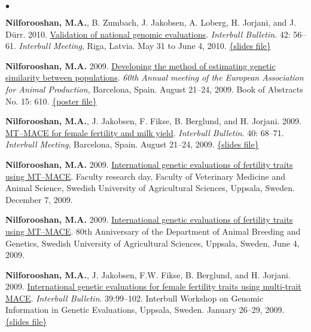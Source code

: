 \documentclass[margin,line]{res}
\newenvironment{list2}{
  \begin{list}{$\bullet$}{%
      \setlength{\itemsep}{0in}
      \setlength{\parsep}{0in} \setlength{\parskip}{0in}
      \setlength{\topsep}{0in} \setlength{\partopsep}{0in}
      \setlength{\leftmargin}{0.2in}}}{\end{list}}
\begin{document}
\begin{resume}
\begin{list2}
\item {\bf Nilforooshan, M.A.}, B. Zumbach, J. Jakobsen, A. Loberg, H. Jorjani, and J. D\"{u}rr. 2010. \href{https://www.researchgate.net/publication/358199921_Validation_of_National_Genomic_Evaluations}{Validation of national genomic evaluations}. {\em Interbull Bulletin}. 42: 56--61. {\em Interbull Meeting}, Riga, Latvia. May 31 to June 4, 2010. \href{https://drive.google.com/file/d/0B2l_izQwJmVpRnlPa0YzS3ZCU1E/view?usp=sharing&resourcekey=0-Tsw-3ZQhJPn8Cm8kG1E6xw}{\{slides file\}}
\item {\bf Nilforooshan, M.A.} 2009. \href{https://www.researchgate.net/publication/358219264_Developing_the_method_of_estimating_genetic_similarity_between_populations}{Developing the method of estimating genetic similarity between populations}. {\em 60th Annual meeting of the European Association for Animal Production}, Barcelona, Spain. August 21--24, 2009. Book of Abstracts No. 15: 610. \href{https://doi.org/10.13140/RG.2.2.11140.40320}{\{poster file\}}
\item {\bf Nilforooshan, M.A.}, J. Jakobsen, F. Fikse, B. Berglund, and H. Jorjani. 2009. \href{https://www.researchgate.net/publication/239611615_MT-MACE_for_Female_Fertility_and_Milk_Yield}{MT–MACE for female fertility and milk yield}. {\em Interbull Bulletin}. 40: 68--71. {\em Interbull Meeting}, Barcelona, Spain. August 21--24, 2009. \href{https://drive.google.com/file/d/0B2l_izQwJmVpRTlrOGE3OWluVnc/view?usp=sharing&resourcekey=0-LiA6IgIqSEjLxrAFkXL_Bw}{\{slides file\}}
\item {\bf Nilforooshan, M.A.} 2009. \href{https://drive.google.com/file/d/0B2l_izQwJmVpUC1TVkx2MVc1ZUE/view?usp=sharing&resourcekey=0-l8dXNYtXDSBuYJHiZwAxZQ}{International genetic evaluations of fertility traits using MT–MACE}. Faculty research day, Faculty of Veterinary Medicine and Animal Science, Swedish University of Agricultural Sciences, Uppsala, Sweden. December 7, 2009.
\item {\bf Nilforooshan, M.A.} 2009. \href{https://drive.google.com/file/d/0B2l_izQwJmVpUC1TVkx2MVc1ZUE/view?usp=sharing&resourcekey=0-l8dXNYtXDSBuYJHiZwAxZQ}{International genetic evaluations of fertility traits using MT–MACE}. 80th Anniversary of the Department of Animal Breeding and Genetics, Swedish University of Agricultural Sciences, Uppsala, Sweden, June 4, 2009.
\item {\bf Nilforooshan, M.A.}, J. Jakobsen, F.W. Fikse, B. Berglund, and H. Jorjani. 2009. \href{https://www.researchgate.net/publication/237781427_International_Genetic_Evaluations_for_Female_Fertility_Traits_Using_Multi-trait_MACE}{International genetic evaluations for female fertility traits using multi-trait MACE}. {\em Interbull Bulletin}. 39:99--102. Interbull Workshop on Genomic Information in Genetic Evaluations, Uppsala, Sweden. January 26--29, 2009. \href{https://drive.google.com/file/d/0B2l_izQwJmVpZG1sZlg2cF9zRWc/view?usp=sharing&resourcekey=0-JmFa0ZnWzZzcCnjVFH3VoA}{\{slides file\}}

\end{list2}
\end{resume}
\end{document}

